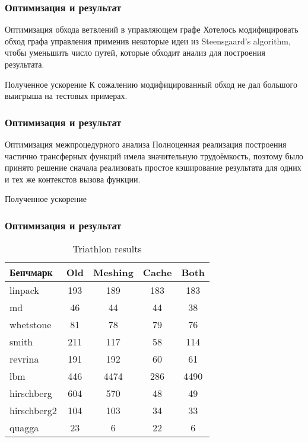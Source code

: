 \documentclass[utf8,russian]{beamer}
\begin{document}

\begin{frame}
\frametitle{Оптимизация и результат}

\begin{block}{Оптимизация обхода ветвлений в управляющем графе}
Хотелось модифицировать обход графа управления применив некоторые идеи из Steensgaard’s algorithm, чтобы уменьшить число путей, которые обходит анализ для построения результата.
\end{block}

\begin{block}{Полученное ускорение}
К сожалению модифицированный обход не дал большого выигрыша на тестовых примерах.  
\end{block}

\end{frame}


\begin{frame}
\frametitle{Оптимизация и результат}

\begin{block}{Оптимизация межпроцедурного анализа}
Полноценная реализация построения частично трансферных функций имела значительную трудоёмкость, поэтому было принято решение сначала реализовать простое кэширование результата для одних и тех же контекстов вызова функции.
\end{block}

\begin{block}{Полученное ускорение}

\end{block}

\end{frame}


\begin{frame}
\frametitle{Оптимизация и результат}

\begin{table}
\begin{tabular}{l | c | c | c | c }
Бенчмарк & Old & Meshing & Cache & Both \\
\hline \hline
linpack & 193 & 189 & 183 & 183 \\ 
md & 46 & 44 & 44 & 38\\
whetstone & 81 & 78 & 79 & 76\\
smith & 211 & 117 & 58 & 114\\
revrina & 191 & 192 & 60 & 61\\
lbm & 446 & 4474 & 286 & 4490\\
hirschberg & 604 & 570 & 48 & 49\\
hirschberg2 & 104 & 103 & 34 & 33\\
quagga & 23 & 6 & 22 & 6
\end{tabular}
\caption{Triathlon results}
\end{table}

\end{frame}

\end{document}
